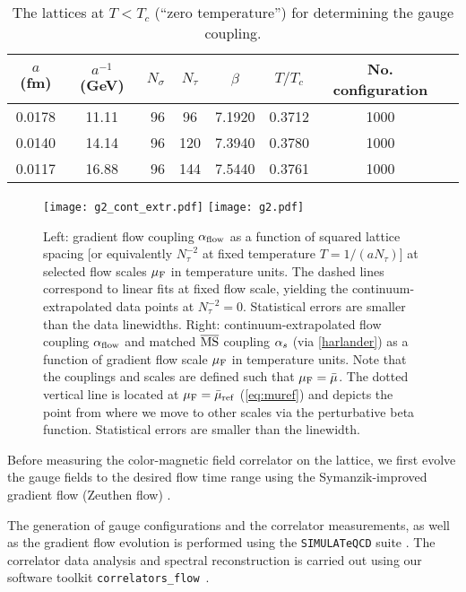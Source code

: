 \documentclass[floatfix,twocolumn,prd,showpacs,preprintnumbers,amsmath,nofootinbib,amssymb,superscriptaddress]{revtex4-2}
\begin{document}
\begin{table}[t]       
    \centering
    \begin{tabular}{ccrccccc}                            
    \hline \hline
    $a$ (fm) & $a^{-1}$ (GeV) & $N_{\sigma}$ & $N_{\tau}$ & $\beta$ & $T/T_{c}$ & No. configuration\tabularnewline
    \hline
    0.0178 & 11.11 & 96 & 96  & 7.1920 &  0.3712  & 1000 \tabularnewline
    0.0140 & 14.14 & 96 & 120  & 7.3940 &  0.3780  & 1000 \tabularnewline
    0.0117 & 16.88 & 96 & 144  & 7.5440 &  0.3761  & 1000 \tabularnewline
    \hline \hline
    \end{tabular}
    \caption{ The lattices at $T<T_c$ (``zero temperature'') for determining the gauge coupling.
    }
    \label{tab_zeroT}
\end{table}

\begin{figure*}[t]
    \null \hfill
    \texttt{[image: g2\_cont\_extr.pdf]}\hspace{2.1cm}
    \texttt{[image: g2.pdf]}\hfill \null
    \caption{Left: gradient flow coupling $\alpha_\text{flow}$ as a function of squared lattice spacing [or equivalently $N_\tau^{-2}$ at fixed temperature $T=1/(a N_\tau)$] at selected flow scales $\mu_\mathrm{F}$ in temperature units. The dashed lines correspond to linear fits at fixed flow scale, yielding the continuum-extrapolated data points at $N_\tau^{-2}=0$. Statistical errors are smaller than the data linewidths. Right: continuum-extrapolated flow coupling $\alpha_\text{flow}$ and matched $\overline{\text{MS}}$ coupling $\alpha_s$ (via \cref{harlander}) as a function of gradient flow scale $\mu_\mathrm{F}$ in temperature units. Note that the couplings and scales are defined such that $\mu_\mathrm{F}=\bar{\mu}$. The dotted vertical line is located at $\mu_\mathrm{F} = \bar{\mu}_\mathrm{ref}$ (\cref{eq:muref}) and depicts the point from where we move to other scales via the perturbative beta function. Statistical errors are smaller than the linewidth.}
    \label{fig:g2-cont-extrap}
\end{figure*}

Before measuring the color-magnetic field correlator on the lattice, we first evolve the gauge fields to the desired flow time range using the Symanzik-improved gradient flow (Zeuthen flow) \cite{Ramos:2015baa}. 

The generation of gauge configurations and the correlator measurements, as well as the gradient flow evolution is performed using the \texttt{SIMULATeQCD} suite \cite{Mazur:2023lvn,Altenkort:2021cvg,Mazur:2021zgi}. The correlator data analysis and spectral reconstruction is carried out using our software toolkit \texttt{correlators\_flow}~\cite{BBdatapublication}.
\end{document}
